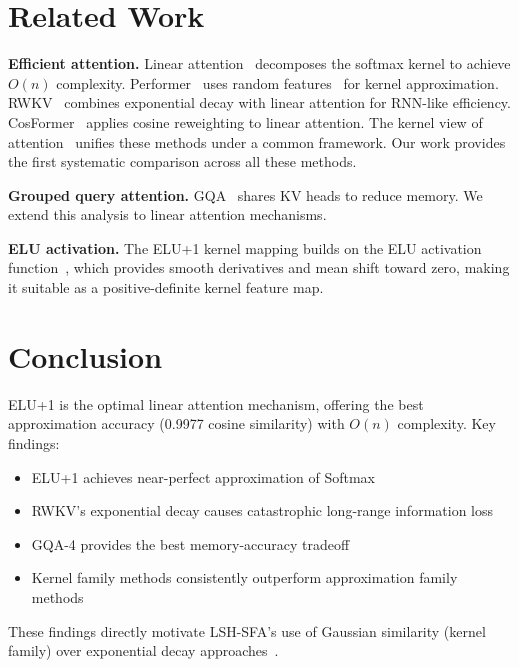 \documentclass{article}
\begin{document}
\section{Related Work}

\textbf{Efficient attention.} Linear attention~\citep{katharopoulos2020transformers} decomposes the softmax kernel to achieve $O(n)$ complexity. Performer~\citep{choromanski2021rethinking} uses random features~\citep{rahimi2007random} for kernel approximation. RWKV~\citep{peng2023rwkv} combines exponential decay with linear attention for RNN-like efficiency. CosFormer~\citep{qin2022cosformer} applies cosine reweighting to linear attention. The kernel view of attention~\citep{tsai2019transformer} unifies these methods under a common framework. Our work provides the first systematic comparison across all these methods.

\textbf{Grouped query attention.} GQA~\citep{ainslie2023gqa} shares KV heads to reduce memory. We extend this analysis to linear attention mechanisms.

\textbf{ELU activation.} The ELU+1 kernel mapping builds on the ELU activation function~\citep{clevert2016fast}, which provides smooth derivatives and mean shift toward zero, making it suitable as a positive-definite kernel feature map.

\section{Conclusion}

ELU+1 is the optimal linear attention mechanism, offering the best approximation accuracy (0.9977 cosine similarity) with $O(n)$ complexity. Key findings:

\begin{itemize}
\item ELU+1 achieves near-perfect approximation of Softmax
\item RWKV's exponential decay causes catastrophic long-range information loss
\item GQA-4 provides the best memory-accuracy tradeoff
\item Kernel family methods consistently outperform approximation family methods
\end{itemize}

These findings directly motivate LSH-SFA's use of Gaussian similarity (kernel family) over exponential decay approaches~\cite{lsh-sfa}.
\end{document}
